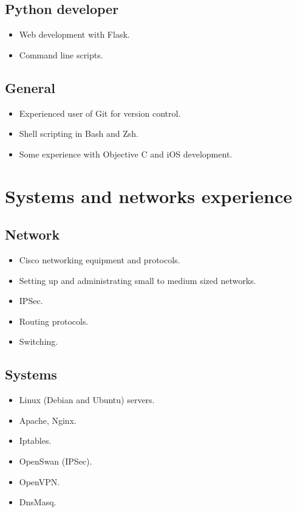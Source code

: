 \documentclass[a4paper, 11pt]{article}
\begin{document}
        \subsection*{Python developer}
            \begin{itemize}
                \item Web development with Flask.
                \item Command line scripts.
            \end{itemize}

        \subsection*{General}
            \begin{itemize}
                \item Experienced user of Git for version control.
                \item Shell scripting in Bash and Zsh.
                \item Some experience with Objective C and iOS development.
            \end{itemize}


    \section*{Systems and networks experience}

        \subsection*{Network}
            \begin{itemize}
                \item Cisco networking equipment and protocols.
                \item Setting up and administrating small to medium sized networks.
                \item IPSec.
                \item Routing protocols.
                \item Switching.
            \end{itemize}

        \subsection*{Systems}
            \begin{itemize}
                \item Linux (Debian and Ubuntu) servers.
                \item Apache, Nginx.
                \item Iptables.
                \item OpenSwan (IPSec).
                \item OpenVPN.
                \item DnsMasq.
            \end{itemize}
\end{document}

